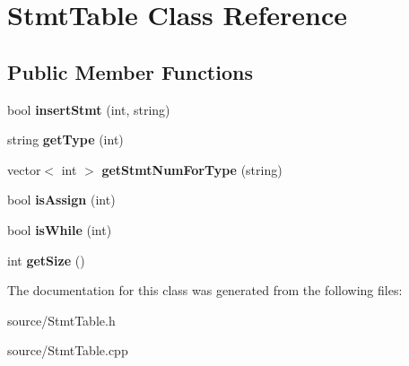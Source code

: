 \hypertarget{class_stmt_table}{}\section{Stmt\+Table Class Reference}
\label{class_stmt_table}
\subsection*{Public Member Functions}
\begin{DoxyCompactItemize}
\item 
\hypertarget{class_stmt_table_ab87f581ea07e3177b050da4fa4ec54c2}{}bool {\bfseries insert\+Stmt} (int, string)\label{class_stmt_table_ab87f581ea07e3177b050da4fa4ec54c2}

\item 
\hypertarget{class_stmt_table_a19d2a3d0b28b6325f8e1ac9e9daf4e30}{}string {\bfseries get\+Type} (int)\label{class_stmt_table_a19d2a3d0b28b6325f8e1ac9e9daf4e30}

\item 
\hypertarget{class_stmt_table_ad1d8493015f93c3c0cb0c7a4c911d3ac}{}vector$<$ int $>$ {\bfseries get\+Stmt\+Num\+For\+Type} (string)\label{class_stmt_table_ad1d8493015f93c3c0cb0c7a4c911d3ac}

\item 
\hypertarget{class_stmt_table_a33d4f971424063732bfaa1370f5ac154}{}bool {\bfseries is\+Assign} (int)\label{class_stmt_table_a33d4f971424063732bfaa1370f5ac154}

\item 
\hypertarget{class_stmt_table_a518a70fcb9c4d063e5397c987656048d}{}bool {\bfseries is\+While} (int)\label{class_stmt_table_a518a70fcb9c4d063e5397c987656048d}

\item 
\hypertarget{class_stmt_table_acf8655893f444c4eb3ade91a200ce72d}{}int {\bfseries get\+Size} ()\label{class_stmt_table_acf8655893f444c4eb3ade91a200ce72d}

\end{DoxyCompactItemize}


The documentation for this class was generated from the following files\+:\begin{DoxyCompactItemize}
\item 
source/Stmt\+Table.\+h\item 
source/Stmt\+Table.\+cpp\end{DoxyCompactItemize}
